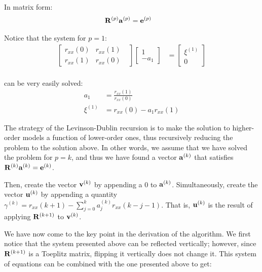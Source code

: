 \documentclass[../main.tex]{subfiles}
\begin{document}
\par In matrix form:
\begin{align*}
\mathbf{R}^{(p)}\mathbf{a}^{(p)} &= \mathbf{e}^{(p)}
\end{align*}
\par Notice that the system for $p=1$:
\begin{align*}
\begin{bmatrix} r_{xx}(0) & r_{xx}(1) \\ r_{xx}(1) & r_{xx}(0) & \end{bmatrix} \left[ \begin{array}{c} 1\\ -a_1  \end{array} \right] &= \left[ \begin{array}{c} \xi^{(1)} \\ 0 \end{array} \right] \\
\end{align*}
\par can be very easily solved:
\begin{align*}
a_1 &= \frac{r_{xx}(1)}{r_{xx}(0)}\\
\xi^{(1)} &= r_{xx}(0) - a_1r_{xx}(1)
\end{align*}
\par The strategy of the Levinson-Dublin recursion is to make the solution to higher-order models a function of lower-order ones, thus recursively reducing the problem to the solution above. In other words, we assume that we have solved the problem for $p=k$, and thus we have found a vector $\mathbf{a}^{(k)}$ that satisfies $\mathbf{R}^{(k)}\mathbf{a}^{(k)} = \mathbf{e}^{(k)}$. 
\par Then, create the vector $\mathbf{v}^{(k)}$ by appending a $0$ to  $\mathbf{a}^{(k)}$. Simultaneously, create the vector $\mathbf{u}^{(k)}$ by appending a quantity $\gamma^{(k)} = r_{xx}(k+1) - \sum_{j=0}^{k}a_j^{(k)}r_{xx}(k-j-1)$. That is, $\mathbf{u}^{(k)}$ is the result of applying $\mathbf{R}^{(k+1)}$ to $\mathbf{v}^{(k)}$. 
\par We have now come to the key point in the derivation of the algorithm. We first notice that the system presented above can be reflected vertically; however, since $\mathbf{R}^{(k+1)}$ is a Toeplitz matrix, flipping it vertically does not change it. This system of equations can be combined with the one presented above to get:
\end{document}
